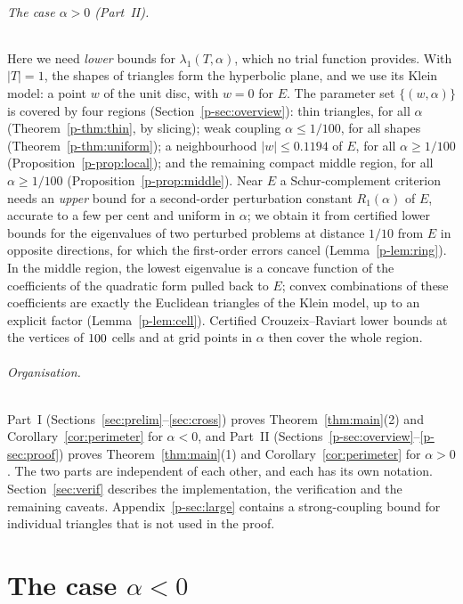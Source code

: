 \documentclass[11pt]{article}
\theoremstyle{remark}
\newcommand{\E}{E}
\begin{document}
\paragraph{The case $\alpha>0$ (Part~II).} Here we need \emph{lower} bounds for $\lambda_1(T,\alpha)$,
which no trial function provides. With $|T|=1$, the shapes of triangles form the hyperbolic plane, and we
use its Klein model: a point $w$ of the unit disc, with $w=0$ for $\E$. The parameter set
$\{(w,\alpha)\}$ is covered by four regions (Section~\ref{p-sec:overview}): thin triangles, for all
$\alpha$ (Theorem~\ref{p-thm:thin}, by slicing); weak coupling $\alpha\le1/100$, for all shapes
(Theorem~\ref{p-thm:uniform}); a neighbourhood $|w|\le0.1194$ of $\E$, for all $\alpha\ge1/100$
(Proposition~\ref{p-prop:local}); and the remaining compact middle region, for all $\alpha\ge1/100$
(Proposition~\ref{p-prop:middle}). Near $\E$ a Schur-complement criterion needs an \emph{upper} bound
for a second-order perturbation constant $R_1(\alpha)$ of $\E$, accurate to a few per cent and uniform
in $\alpha$; we obtain it from certified lower bounds for the eigenvalues of two perturbed problems at
distance $1/10$ from $\E$ in opposite directions, for which the first-order errors cancel
(Lemma~\ref{p-lem:ring}). In the middle region, the lowest eigenvalue is a concave function of the
coefficients of the quadratic form pulled back to $\E$; convex combinations of these coefficients are
exactly the Euclidean triangles of the Klein model, up to an explicit factor
(Lemma~\ref{p-lem:cell}). Certified Crouzeix--Raviart lower bounds at the vertices of $100$ cells
and at grid points in $\alpha$ then cover the whole region.

\paragraph{Organisation.} Part~I (Sections~\ref{sec:prelim}--\ref{sec:cross}) proves
Theorem~\ref{thm:main}(2) and Corollary~\ref{cor:perimeter} for $\alpha<0$, and Part~II
(Sections~\ref{p-sec:overview}--\ref{p-sec:proof}) proves Theorem~\ref{thm:main}(1) and
Corollary~\ref{cor:perimeter} for $\alpha>0$. The two parts are
independent of each other, and each has its own notation. Section~\ref{sec:verif} describes the
implementation, the verification and the remaining caveats. Appendix~\ref{p-sec:large} contains a
strong-coupling bound for individual triangles that is not used in the proof.

\part{The case \texorpdfstring{$\alpha<0$}{alpha < 0}}
\end{document}
